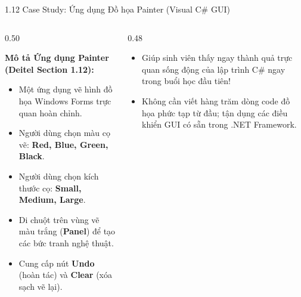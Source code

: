 \documentclass[aspectratio=169, 10pt]{beamer}
\begin{document}
\begin{frame}{1.12 Case Study: Ứng dụng Đồ họa Painter (Visual C\# GUI)}
  \begin{columns}[c]
    \begin{column}{0.50\textwidth}
      \begin{block}{\textbf{Mô tả Ứng dụng Painter (Deitel Section 1.12):}}
        \begin{itemize}
          \item Một ứng dụng vẽ hình đồ họa Windows Forms trực quan hoàn chỉnh.
          \item Người dùng chọn màu cọ vẽ: \textbf{Red, Blue, Green, Black}.
          \item Người dùng chọn kích thước cọ: \textbf{Small, Medium, Large}.
          \item Di chuột trên vùng vẽ màu trắng (\textbf{Panel}) để tạo các bức tranh nghệ thuật.
          \item Cung cấp nút \textbf{Undo} (hoàn tác) và \textbf{Clear} (xóa sạch vẽ lại).
        \end{itemize}
      \end{block}
    \end{column}
    \begin{column}{0.48\textwidth}
      \begin{tcolorbox}[colback=UniLightBlue,colframe=UniBlue,title=\textbf{Bài học Sư phạm cốt lõi}]
        \begin{itemize}\scriptsize
          \item Giúp sinh viên thấy ngay thành quả trực quan sống động của lập trình C\# ngay trong buổi học đầu tiên!
          \item Không cần viết hàng trăm dòng code đồ họa phức tạp từ đầu; tận dụng các điều khiển GUI có sẵn trong .NET Framework.
        \end{itemize}
      \end{tcolorbox}
    \end{column}
  \end{columns}
\end{frame}
\end{document}
